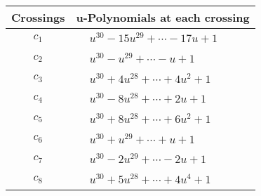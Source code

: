\documentclass[1p]{elsarticle_modified}
\theoremstyle{definition}
\begin{document}
\begin{tabular}{m{50pt}|m{274pt}}
Crossings & \hspace{64pt}u-Polynomials at each crossing \\
\hline $$\begin{aligned}c_{1}\end{aligned}$$&$\begin{aligned}
&u^{30}-15 u^{29}+\cdots-17 u+1
\end{aligned}$\\
\hline $$\begin{aligned}c_{2}\end{aligned}$$&$\begin{aligned}
&u^{30}- u^{29}+\cdots- u+1
\end{aligned}$\\
\hline $$\begin{aligned}c_{3}\end{aligned}$$&$\begin{aligned}
&u^{30}+4 u^{28}+\cdots+4 u^2+1
\end{aligned}$\\
\hline $$\begin{aligned}c_{4}\end{aligned}$$&$\begin{aligned}
&u^{30}-8 u^{28}+\cdots+2 u+1
\end{aligned}$\\
\hline $$\begin{aligned}c_{5}\end{aligned}$$&$\begin{aligned}
&u^{30}+8 u^{28}+\cdots+6 u^2+1
\end{aligned}$\\
\hline $$\begin{aligned}c_{6}\end{aligned}$$&$\begin{aligned}
&u^{30}+u^{29}+\cdots+u+1
\end{aligned}$\\
\hline $$\begin{aligned}c_{7}\end{aligned}$$&$\begin{aligned}
&u^{30}-2 u^{29}+\cdots-2 u+1
\end{aligned}$\\
\hline $$\begin{aligned}c_{8}\end{aligned}$$&$\begin{aligned}
&u^{30}+5 u^{28}+\cdots+4 u^4+1
\end{aligned}$\\

\end{tabular}
\end{document}
